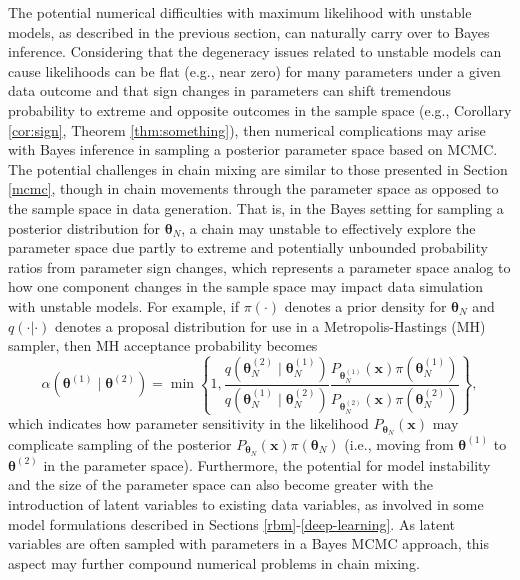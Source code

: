\documentclass[]{article}
\theoremstyle{definition}
\begin{document}
The potential numerical difficulties with maximum likelihood with
unstable models, as described in the previous section, can naturally
carry over to Bayes inference. Considering that the degeneracy issues
related to unstable models can cause likelihoods can be flat (e.g., near
zero) for many parameters under a given data outcome and that sign
changes in parameters can shift tremendous probability to extreme and
opposite outcomes in the sample space (e.g., Corollary \ref{cor:sign},
Theorem \ref{thm:something}), then numerical complications may arise
with Bayes inference in sampling a posterior parameter space based on
MCMC. The potential challenges in chain mixing are similar to those
presented in Section \ref{mcmc}, though in chain movements through the
parameter space as opposed to the sample space in data generation. That
is, in the Bayes setting for sampling a posterior distribution for
\(\boldsymbol \theta_N\), a chain may unstable to effectively explore
the parameter space due partly to extreme and potentially unbounded
probability ratios from parameter sign changes, which represents a
parameter space analog to how one component changes in the sample space
may impact data simulation with unstable models. For example, if
\(\pi(\cdot)\) denotes a prior density for \(\boldsymbol \theta_N\) and
\(q(\cdot | \cdot)\) denotes a proposal distribution for use in a
Metropolis-Hastings (MH) sampler, then MH acceptance probability becomes
\[
\alpha\left(\boldsymbol \theta^{(1)} \mid \boldsymbol \theta^{(2)}\right)= \min\left\{1,
\frac{q(\boldsymbol \theta_N^{(2)} \mid \boldsymbol \theta_N^{(1)})}{q(\boldsymbol \theta_N^{(1)} \mid \boldsymbol \theta_N^{(2)})}
\frac{P_{\boldsymbol \theta_N^{(1)}} ( \boldsymbol x ) \pi(\boldsymbol \theta_N^{(1)}) }{P_{\boldsymbol \theta^{(2)}_N} (  \boldsymbol x) \pi(\boldsymbol \theta_N^{(2)}) } \right\},
\] which indicates how parameter sensitivity in the likelihood
\(P_{\boldsymbol \theta_N} ( \boldsymbol x)\) may complicate sampling of
the posterior
\(P_{\boldsymbol \theta_N} ( \boldsymbol x) \pi(\boldsymbol \theta_N)\)
(i.e., moving from \(\boldsymbol \theta^{(1)}\) to
\(\boldsymbol \theta^{(2)}\) in the parameter space). Furthermore, the
potential for model instability and the size of the parameter space can
also become greater with the introduction of latent variables to
existing data variables, as involved in some model formulations
described in Sections \ref{rbm}-\ref{deep-learning}. As latent variables
are often sampled with parameters in a Bayes MCMC approach, this aspect
may further compound numerical problems in chain mixing.
\end{document}
